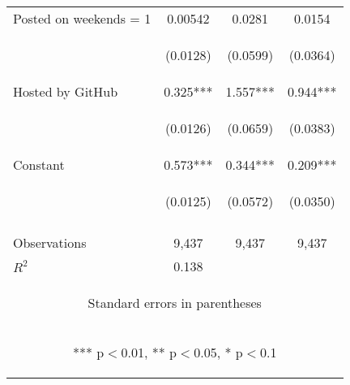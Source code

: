 \begin{center}
\begin{tabular}{lccc}
Posted on weekends = 1 & 0.00542 & 0.0281 & 0.0154 \\
\vspace{4pt} & \begin{footnotesize}(0.0128)\end{footnotesize} & \begin{footnotesize}(0.0599)\end{footnotesize} & \begin{footnotesize}(0.0364)\end{footnotesize} \\
Hosted by GitHub & 0.325*** & 1.557*** & 0.944*** \\
\vspace{4pt} & \begin{footnotesize}(0.0126)\end{footnotesize} & \begin{footnotesize}(0.0659)\end{footnotesize} & \begin{footnotesize}(0.0383)\end{footnotesize} \\
Constant & 0.573*** & 0.344*** & 0.209*** \\
 & \begin{footnotesize}(0.0125)\end{footnotesize} & \begin{footnotesize}(0.0572)\end{footnotesize} & \begin{footnotesize}(0.0350)\end{footnotesize} \\
\vspace{4pt} & \begin{footnotesize}\end{footnotesize} & \begin{footnotesize}\end{footnotesize} & \begin{footnotesize}\end{footnotesize} \\
Observations & 9,437 & 9,437 & 9,437 \\
 $R^2$ & 0.138 &  &  \\ \hline
\multicolumn{4}{c}{\begin{footnotesize} Standard errors in parentheses\end{footnotesize}} \\
\multicolumn{4}{c}{\begin{footnotesize} *** p$<$0.01, ** p$<$0.05, * p$<$0.1\end{footnotesize}} \\
\end{tabular}
\end{center}
